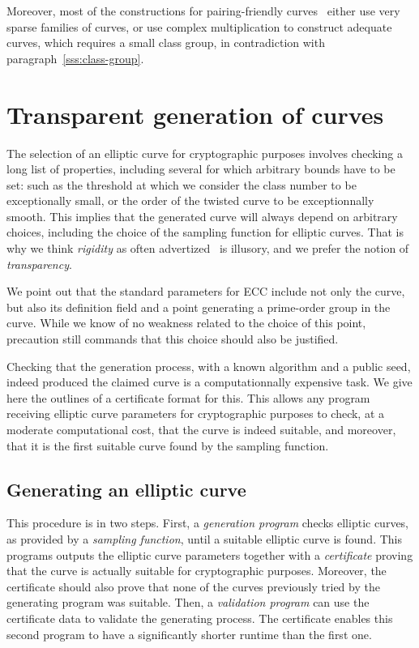 \documentclass[twocolumn,letterpaper,10pt]{article}
\begin{document}
Moreover, most of the constructions
for pairing-friendly curves~\cite{jc2010fst,space2014em}
either use very sparse families of curves,
or use complex multiplication to construct adequate curves,
which requires a small class group,
in contradiction with paragraph~\ref{sss:class-group}.

\section{Transparent generation of curves}
\label{s:certif}

The selection of an elliptic curve for cryptographic purposes
involves checking a long list of properties,
including several for which arbitrary bounds have to be set:
such as the threshold at which we consider the class number
to be exceptionally small,
or the order of the twisted curve to be exceptionnally smooth.
This implies that the generated curve
will always depend on arbitrary choices,
including the choice of the sampling function for elliptic curves.
That is why we think \emph{rigidity} as often advertized~\cite{safecurves}
is illusory, and we prefer the notion of \emph{transparency}.

We point out that the standard parameters for ECC
include not only the curve, but also its definition field
and a point generating a prime-order group in the curve.
While we know of no weakness related to the choice of this point,
precaution still commands that this choice should also be justified.


Checking that the generation process,
with a known algorithm and a public seed,
indeed produced the claimed curve
is a computationnally expensive task.
We give here the outlines of a certificate format for this.
This allows any program receiving elliptic curve parameters
for cryptographic purposes
to check, at a moderate computational cost,
that the curve is indeed suitable,
and moreover, that it is the first suitable curve
found by the sampling function.

\subsection{Generating an elliptic curve}

This procedure is in two steps.
First, a \emph{generation program}
checks elliptic curves, as provided by a \emph{sampling function},
until a suitable elliptic curve is found.
This programs outputs the elliptic curve parameters
together with a \emph{certificate} proving that
the curve is actually suitable for cryptographic purposes.
Moreover, the certificate should also prove that
none of the curves previously tried by the generating program
was suitable.
Then, a \emph{validation program} can use the certificate data
to validate the generating process.
The certificate enables this second program
to have a significantly shorter runtime than the first one.
\end{document}

